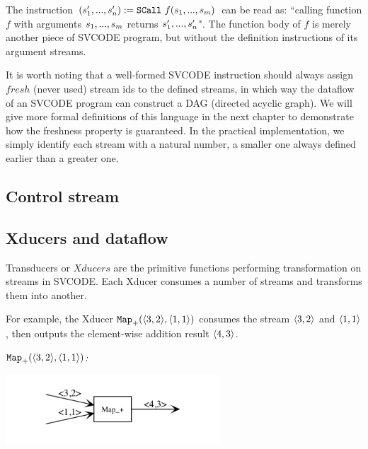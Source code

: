 The instruction $\scall{f}{\replc{m}{s}}{(\replc{n}{s'})}$ can be read as: ``calling function $f$ with arguments $\replc{m}{s}$ returns $\replc{n}{s'}$". 
The function body of $f$ is merely another piece of SVCODE program, but without the definition instructions of its argument streams.


It is worth noting that a well-formed SVCODE instruction should always assign $fresh$ (never used) stream ids to the defined streams, in which way the dataflow of an SVCODE program can construct a DAG (directed acyclic graph). 
We will give more formal definitions of this language in the next chapter
to demonstrate how the freshness property is guaranteed. 
In the practical implementation, we simply identify each stream with a natural number, a smaller one always defined earlier than a greater one. 


\subsection{Control stream}

\subsection{Xducers and dataflow}

Transducers or $Xducers$ are the primitive functions performing transformation on streams in SVCODE. 
Each Xducer consumes a number of streams and transforms them into another. 

For example, the Xducer $\map{+}(\<3,2\'>, \< 1,1\'>)$ consumes the stream $\<3,2\'>$ and $\< 1,1\'>$, then outputs 
the element-wise addition result $\<4, 3\'>$. 

\begin{example} \emph{$\map{+}(\<3,2\'>, \< 1,1\'>)$:}\\
	\begin{center}
		\includegraphics[width=0.6\textwidth]{fig/map.png}
	\end{center}
\end{example}


%

